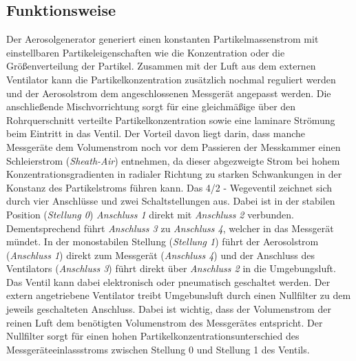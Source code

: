 \newpage

\subsection{Funktionsweise}
Der Aerosolgenerator generiert einen konstanten Partikelmassenstrom mit einstellbaren Partikeleigenschaften wie die Konzentration oder die Gr\"{o}{\ss}enverteilung der Partikel. Zusammen mit der Luft aus dem externen Ventilator kann die Partikelkonzentration zus\"{a}tzlich nochmal reguliert werden und der Aerosolstrom dem angeschlossenen Messger\"{a}t angepasst werden. Die anschlie{\ss}ende Mischvorrichtung sorgt f\"{u}r eine gleichm\"{a}{\ss}ige \"{u}ber den Rohrquerschnitt verteilte Partikelkonzentration sowie eine laminare Str\"{o}mung beim Eintritt in das Ventil. Der Vorteil davon liegt darin, dass manche Messger\"{a}te dem Volumenstrom noch vor dem Passieren der Messkammer einen Schleierstrom (\textit{Sheath-Air}) entnehmen, da dieser abgezweigte Strom bei hohem Konzentrationsgradienten in radialer Richtung zu starken Schwankungen in der Konstanz des Partikelstroms f\"{u}hren kann. Das 4/2 - Wegeventil zeichnet sich durch vier Anschl\"{u}sse und zwei Schaltstellungen aus. Dabei ist in der stabilen Position (\textit{Stellung 0}) \textit{Anschluss 1} direkt mit \textit{Anschluss 2} verbunden. Dementsprechend f\"{u}hrt \textit{Anschluss 3} zu \textit{Anschluss 4}, welcher in das Messger\"{a}t m\"{u}ndet. In der monostabilen Stellung (\textit{Stellung 1}) f\"{u}hrt der Aerosolstrom (\textit{Anschluss 1}) direkt zum Messger\"{a}t (\textit{Anschluss 4}) und der Anschluss des Ventilators (\textit{Anschluss 3}) f\"{u}hrt direkt \"{u}ber \textit{Anschluss 2} in die Umgebungsluft. Das Ventil kann dabei elektronisch oder pneumatisch geschaltet werden. Der extern angetriebene Ventilator treibt Umgebunsluft durch einen Nullfilter zu dem jeweils geschalteten Anschluss. Dabei ist wichtig, dass der Volumenstrom der reinen Luft dem ben\"{o}tigten Volumenstrom des Messger\"{a}tes entspricht. Der Nullfilter sorgt f\"{u}r einen hohen Partikelkonzentrationsunterschied des Messger\"{a}teeinlassstroms zwischen Stellung 0 und Stellung 1 des Ventils.

